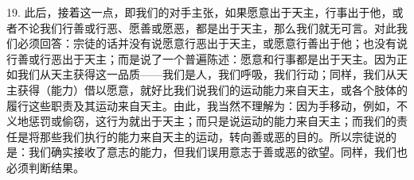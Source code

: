 19. 此后，接着这一点，即我们的对手主张，如果愿意出于天主，行事出于他，或者不论我们行善或行恶、愿善或愿恶，都是出于天主，那么我们就无可言。对此我们必须回答：宗徒的话并没有说愿意行恶出于天主，或愿意行善出于他；也没有说行善或行恶出于天主；而是说了一个普遍陈述：愿意和行事都是出于天主。因为正如我们从天主获得这一品质——我们是人，我们呼吸，我们行动；同样，我们从天主获得（能力）借以愿意，就好比我们说我们的运动能力来自天主，或各个肢体的履行这些职责及其运动来自天主。由此，我当然不理解为：因为手移动，例如，不义地惩罚或偷窃，这行为就出于天主；而只是说运动的能力来自天主；而我们的责任是将那些我们执行的能力来自天主的运动，转向善或恶的目的。所以宗徒说的是：我们确实接收了意志的能力，但我们误用意志于善或恶的欲望。同样，我们也必须判断结果。\par

